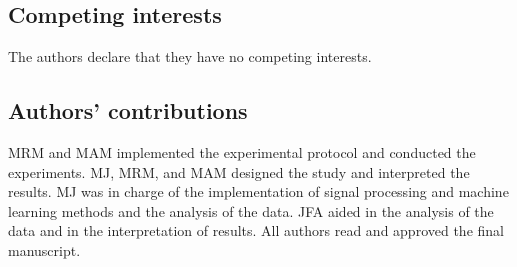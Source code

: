 \subsection{Competing interests}
The authors declare that they have no competing interests.


\subsection{Authors’ contributions}
MRM and MAM implemented the experimental protocol and conducted the experiments. MJ, MRM, and MAM designed the study and interpreted the results. MJ was in charge of the implementation of signal processing and machine learning methods and the analysis of the data. JFA aided in the analysis of the data and in the interpretation of results. All authors read and approved the final manuscript.


